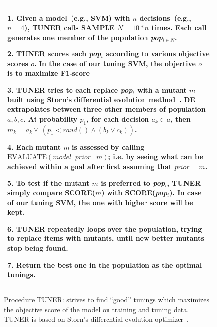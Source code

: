 \documentclass[sigconf,review, anonymous]{acmart}
\theoremstyle{break}
\begin{document}
  \begin{figure}[!htp]\small
     \begin{tabular}{|p{.95\linewidth}|}\hline
      1. Given a model~(e.g., SVM) with $n$ decisions~(e.g., $n=4$),
      TUNER calls SAMPLE $N=10*n$ times.
      Each call generates one member of the population {\em pop$_{i\in N}$}.

      2. TUNER scores each {\em pop}$_i$ according to various objective
      scores $o$. In the case of our tuning SVM, the objective $o$ is to maximize
     {F1-score}

     3. TUNER tries to each replace {\em pop}$_i$ with a mutant $m$
     built using Storn's differential evolution method~\cite{storn1997differential}.
     DE extrapolates between three other members of population $a,b,c$.
     At probability $p_1$, for each decision $a_k \in a$, then
     $m_k= a_k \vee ~(p_1 < \mathit{rand}() \wedge( b_k \vee c_k))$.

     4. Each mutant $m$ is assessed by calling  $\text{EVALUATE}(\textit{model, prior=m})$;
     i.e. by seeing what can be achieved within a goal after first assuming
     that $\textit{prior}=m$.

     5. To test if the mutant $m$ is preferred to {\em pop}$_i$, TUNER simply
      compare SCORE($m$) with SCORE({\em pop}$_i$). In case of our tuning SVM,
      the one with higher score will be kept.

    6. TUNER repeatedly loops over the population, trying to replace  items with mutants, until new better mutants stop being found.

    7. Return the best one in the population as the optimal tunings.
    \\\hline
    \end{tabular}
    \caption{Procedure TUNER: strives to find ``good'' tunings which maximizes
     the objective score of the model on training and tuning data. TUNER is based on Storn's differential evolution optimizer~\cite{storn1997differential}.}
    \label{fig:optimize}
\end{figure}
\end{document}
